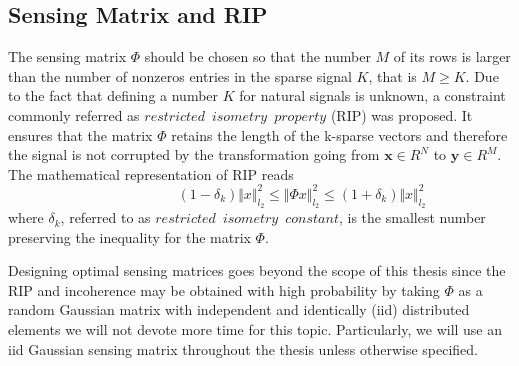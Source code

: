 \FloatBarrier

\subsection{Sensing Matrix and RIP}
The sensing matrix $\Phi$ should be chosen so that the number $M$ of its rows is larger than the number of nonzeros entries in the sparse signal $K$, that is $M \geq K$. Due to the fact that defining a number $K$ for natural signals is unknown, a constraint commonly referred as $restricted \enspace isometry \enspace property$ (RIP) \cite{candes2005decoding,candes2006stable,candes2008restricted} was proposed. It ensures that the matrix $\Phi$ retains the length of the k-sparse vectors and therefore the signal is not corrupted  by the transformation going from $\mathbf{x} \in R^N $ to $\mathbf{y} \in R^M $. The mathematical representation of RIP reads
\begin{equation} \label{eq:rip1}
\hspace{3em} \hspace{3em} \hspace{3em} (1-\delta_k)\Vert x \Vert_{l_2}^2 \leq \Vert \Phi x \Vert_{l_2}^2 \leq (1+\delta_k)\Vert x \Vert_{l_2}^2  \hspace{3em}
\end{equation}  
where $\delta_k$, referred to as $restricted \enspace isometry \enspace constant$, is the smallest number preserving the inequality for the matrix $\Phi$. \

Designing optimal sensing matrices goes beyond the scope of this thesis since the RIP and incoherence may be obtained with high probability by taking $\Phi$ as a random Gaussian matrix with independent and identically (iid) distributed elements\cite{candes2005signal} we will not devote more time for this topic. Particularly, we will use an iid Gaussian sensing matrix throughout the thesis unless otherwise specified.   

\FloatBarrier      

